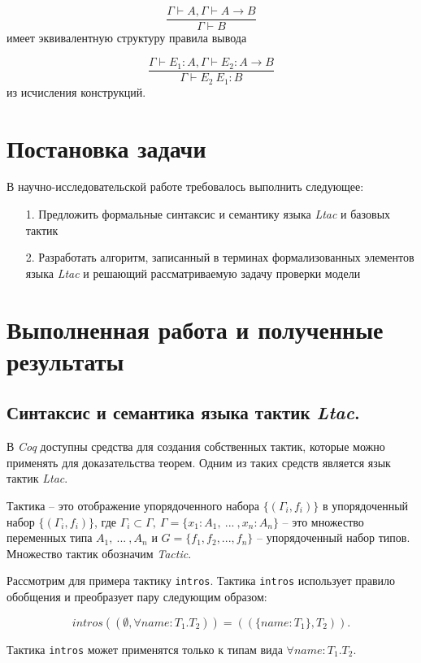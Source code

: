 \documentclass[12pt]{article}
\begin{document}
$$\frac{\Gamma \vdash A, \Gamma \vdash A \xrightarrow{} B}{\Gamma \vdash B}$$
имеет эквивалентную структуру правила вывода 

$$\frac{\Gamma \vdash E_1:A, \Gamma \vdash E_2: A \xrightarrow{} B}{\Gamma \vdash E_2\ E_1 :B}$$ из исчисления конструкций.






\section{Постановка задачи}
В научно-исследовательской работе требовалось выполнить следующее:
\begin{enumerate}
    \item[1.] Предложить формальные синтаксис и семантику языка \textit{Ltac} и базовых тактик
    \item[2.] Разработать алгоритм, записанный в терминах формализованных элементов языка \textit{Ltac} и решающий рассматриваемую задачу проверки модели
\end{enumerate}

  
\clearpage
\section{Выполненная работа и полученные результаты}


\subsection{Синтаксис и семантика языка тактик \textit{Ltac}.}

В \textit{Coq} доступны средства для создания собственных тактик, которые можно применять для доказательства теорем. Одним из таких средств является язык тактик \textit{Ltac}. 

Тактика -- это отображение упорядоченного набора $\{(\Gamma_i, f_i)\}$ в упорядоченный набор $\{(\Gamma_i, f_i)\}$, где
$\Gamma_i \subset \Gamma,\ \Gamma = \{x_1:A_1,\ ...\ , x_n:A_n\}$ -- это множество переменных типа $A_1,\ ...\ , A_n$ и $G= \{f_1, f_2, ..., f_n\}$ -- упорядоченный набор типов. Множество тактик обозначим \textit{Tactic}.

Рассмотрим для примера тактику \verb|intros|. Тактика \verb|intros| использует правило обобщения и преобразует пару следующим образом:

$$intros((\emptyset, \forall name: T_1. T_2)) = ((\{name:T_1\}, T_2)).$$

Тактика \verb|intros| может применятся только к типам вида $\forall name: T_1. T_2$.
\end{document}
